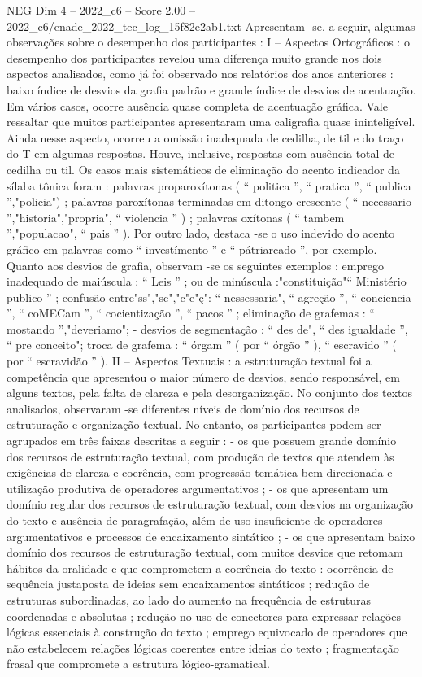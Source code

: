 \begin{textsample}{NEG Dim 4 – 2022\_c6 – Score 2.00 – 2022\_c6/enade\_2022\_tec\_log\_15f82e2ab1.txt}
Apresentam -se, a seguir, algumas observações sobre o desempenho dos participantes : I – Aspectos Ortográficos : o desempenho dos participantes revelou uma diferença muito grande nos dois aspectos analisados, como já foi observado nos relatórios dos anos anteriores : baixo índice de desvios da grafia padrão e grande índice de desvios de acentuação.
Em vários casos, ocorre ausência quase completa de acentuação gráfica.
Vale ressaltar que muitos participantes apresentaram uma caligrafia quase ininteligível.
Ainda nesse aspecto, ocorreu a omissão inadequada de cedilha, de til e do traço do T em algumas respostas.
Houve, inclusive, respostas com ausência total de cedilha ou til.
Os casos mais sistemáticos de eliminação do acento indicador da sílaba tônica foram : palavras proparoxítonas ( “ politica ”, “ pratica ”, “ publica ”,"policia") ; palavras paroxítonas terminadas em ditongo crescente ( “ necessario ”,"historia","propria", “ violencia ” ) ; palavras oxítonas ( “ tambem ”,"populacao", “ pais ” ).
Por outro lado, destaca -se o uso indevido do acento gráfico em palavras como “ investímento ” e “ pátriarcado ”, por exemplo.
Quanto aos desvios de grafia, observam -se os seguintes exemplos : emprego inadequado de maiúscula : “ Leis ” ; ou de minúscula :"constituição"“ Ministério publico ” ; confusão entre"ss","sc","c"e"ç": “ nessessaria", “ agreção ”, “ conciencia ”, “ coMECam ”, “ cocientização ”, “ pacos ” ; eliminação de grafemas : “ mostando ”,"deveriamo"; - desvios de segmentação : “ des de", “ des igualdade ”, “ pre conceito"; troca de grafema : “ órgam ” ( por “ órgão ” ), “ escravido ” ( por “ escravidão ” ).
II – Aspectos Textuais : a estruturação textual foi a competência que apresentou o maior número de desvios, sendo responsável, em alguns textos, pela falta de clareza e pela desorganização.
No conjunto dos textos analisados, observaram -se diferentes níveis de domínio dos recursos de estruturação e organização textual.
No entanto, os participantes podem ser agrupados em três faixas descritas a seguir : - os que possuem grande domínio dos recursos de estruturação textual, com produção de textos que atendem às exigências de clareza e coerência, com progressão temática bem direcionada e utilização produtiva de operadores argumentativos ; - os que apresentam um domínio regular dos recursos de estruturação textual, com desvios na organização do texto e ausência de paragrafação, além de uso insuficiente de operadores argumentativos e processos de encaixamento sintático ; - os que apresentam baixo domínio dos recursos de estruturação textual, com muitos desvios que retomam hábitos da oralidade e que comprometem a coerência do texto : ocorrência de sequência justaposta de ideias sem encaixamentos sintáticos ; redução de estruturas subordinadas, ao lado do aumento na frequência de estruturas coordenadas e absolutas ; redução no uso de conectores para expressar relações lógicas essenciais à construção do texto ; emprego equivocado de operadores que não estabelecem relações lógicas coerentes entre ideias do texto ; fragmentação frasal que compromete a estrutura lógico-gramatical.

\end{textsample}
